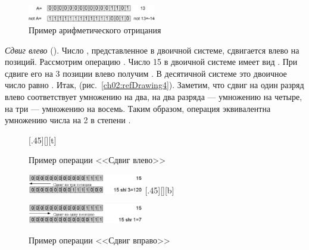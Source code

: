 \begin{figure}[htb]
\begin{center}
\includegraphics[width=0.5\textwidth]{img/ris_2_4}
\caption{Пример арифметического отрицания}
\label{ch02:refDrawing3}
\end{center}
\end{figure}

\emph{Сдвиг влево} (). Число
, представленное в двоичной системе, сдвигается
влево на  позиций. Рассмотрим операцию . Число 15 в двоичной системе
имеет вид . При сдвиге его на 3 позиции влево получим . В десятичной 
системе это двоичное число равно .
Итак,  (рис.~\ref{ch02:refDrawing4}). Заметим, что сдвиг на один разряд влево соответствует
умножению на два, на два разряда --- умножению на четыре, на три --- умножению на восемь. Таким образом, операция
 эквивалентна умножению числа  на 2 в степени . 


\begin{figure}[H]
\begin{floatrow}
[.45\textwidth][\FBheight][t]
{\caption{Пример операции <<Сдвиг влево>>}
\label{ch02:refDrawing4}}
{\includegraphics[width=0.45\textwidth,keepaspectratio]{img/ris_2_5}}\hspace*{0.05\textwidth}
%
[.45\textwidth][\FBheight][b]
{\caption{Пример операции <<Сдвиг вправо>>}
\label{ch02:refDrawing5}}
{\includegraphics[width=0.45\textwidth,keepaspectratio]{img/ris_2_6}}
\end{floatrow}
\end{figure}


